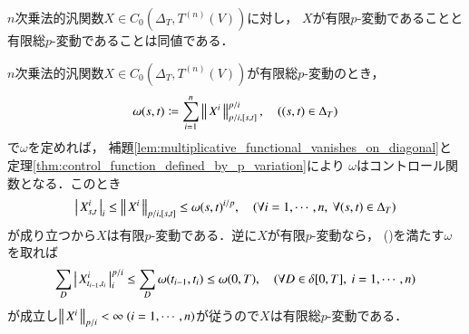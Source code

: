 	\begin{screen}
		\begin{thm}
			$n$次乗法的汎関数$X \in C_0 \left(\Delta_T,T^{(n)}(V) \right)$に対し，
			$X$が有限$p$-変動であることと有限総$p$-変動であることは同値である．
		\end{thm}
	\end{screen}
	
	\begin{prf}
		$n$次乗法的汎関数$X \in C_0 \left(\Delta_T,T^{(n)}(V) \right)$が有限総$p$-変動のとき，
		\begin{align}
			\omega(s,t) \coloneqq \sum_{i=1}^n \left\|\, X^i\, \right\|_{p/i,[s,t]}^{p/i},
			\quad ((s,t) \in \Delta_T)
		\end{align}
		で$\omega$を定めれば，
		補題\ref{lem:multiplicative_functional_vanishes_on_diagonal}と
		定理\ref{thm:control_function_defined_by_p_variation}により
		$\omega$はコントロール関数となる．このとき
		\begin{align}
			\left|\, X^i_{s,t}\, \right|_{i}
			\leq \left\|\, X^i\, \right\|_{p/i,[s,t]}
			\leq \omega(s,t)^{i/p},
			\quad (\forall i = 1,\cdots,n,\ \forall (s,t) \in \Delta_T)
		\end{align}
		が成り立つから$X$は有限$p$-変動である．逆に$X$が有限$p$-変動なら，
		()を満たす$\omega$を取れば
		\begin{align}
			\sum_D \left|\, X^i_{t_{i-1},t_i}\, \right|_{i}^{p/i}
			\leq \sum_D \omega(t_{i-1},t_i)
			\leq \omega(0,T),
			\quad (\forall D \in \delta[0,T],\ i=1,\cdots,n)
		\end{align}
		が成立し$\Norm{X^i}{p/i} < \infty\ (i=1,\cdots,n)$が従うので$X$は有限総$p$-変動である．
		\QED
	\end{prf}
	
